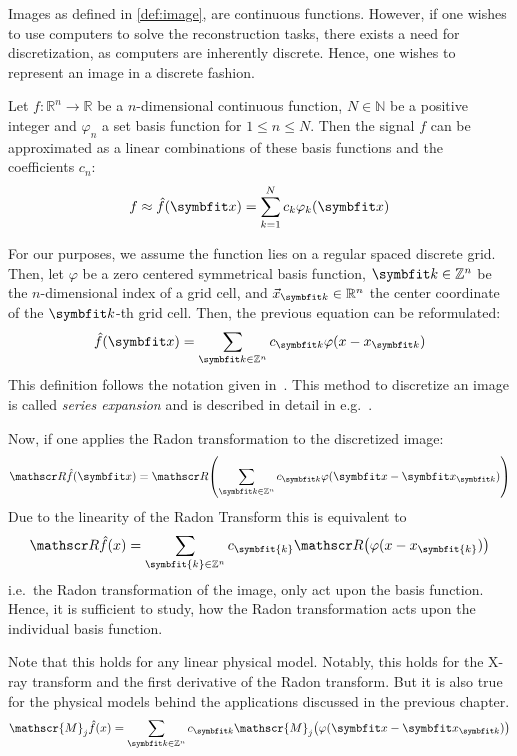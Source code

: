 Images as defined in \autoref{def:image}, are continuous functions. However, if one wishes to use
computers to solve the reconstruction tasks, there exists a need for discretization, as computers
are inherently discrete. Hence, one wishes to represent an image in a discrete fashion.

\begin{definition}
	\label{def:permissible_representation}
	Let \(f\colon \mathbb{R}^n \to \mathbb{R}\) be a \(n\)-dimensional continuous function,
	\(N \in \mathbb{N}\) be a positive integer and \(\varphi_n\) a set basis function for
	\(1 \leq n \leq N\). Then the signal \(f\) can be approximated as a linear combinations
	of these basis functions and the coefficients \(c_n\):
	\[ f \approx \near{f}(\mvec{x}) = \sum_{k=1}^{N} c_k \varphi_k(\mvec{x}) \]
\end{definition}


For our purposes, we assume the function lies on a regular spaced discrete grid. Then, let
\(\varphi\) be a zero centered symmetrical basis function, \(\mvec{k} \in \mathbb{Z}^n\) be the
\(n\)-dimensional index of a grid cell, and \(\vec{x}_{\mvec{k}} \in \mathbb{R}^n\) the center
coordinate of the \(\mvec{k}\)-th grid cell. Then, the previous equation can be reformulated:
\[ \near{f}(\mvec{x}) = \sum_{\mvec{k} \in \mathbb{Z}^n} c_{\mvec{k}} \varphi(x - x_{\mvec{k}}) \]
This definition follows the notation given in~\cite{momey_new_2011}. This method to discretize an
image is called \textit{series expansion} and is described in detail in
e.g.\ \cite{herman_basis_2015}.

Now, if one applies the Radon transformation to the discretized image: 
\[ \radon\near{f}(\mvec{x}) = \radon\left( \sum_{\mvec{k} \in \mathbb{Z}^n} c_{\mvec{k}} \varphi(\mvec{x} - \mvec{x}_{\mvec{k}}) \right) \]
Due to the linearity of the Radon Transform this is equivalent to
\[ \radon\hat{f}(x) = \sum_{\symbfit{k} \in \mathbb{Z}^n} c_{\symbfit{k}}\radon\left( \varphi(x - x_{\symbfit{k}}) \right) \]
i.e.\ the Radon transformation of the image, only act upon the basis function. Hence, it is
sufficient to study, how the Radon transformation acts upon the individual basis function.

Note that this holds for any linear physical model. Notably, this holds for the X-ray transform and
the first derivative of the Radon transform. But it is also true for the physical models behind the
applications discussed in the previous chapter.
\[ \mathscr{M}_j\near{f}(x) = \sum_{\mvec{k} \in \mathbb{Z}^n} c_{\mvec{k}}\mathscr{M}_j\left( \varphi(\mvec{x} - \mvec{x}_{\mvec{k}}) \right) \]

